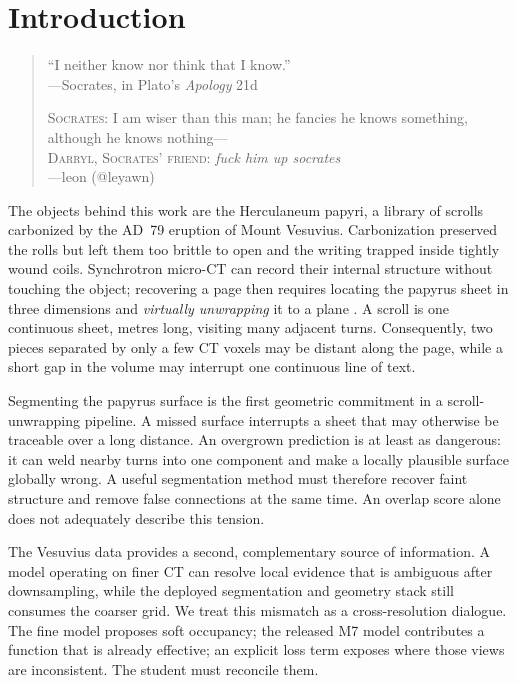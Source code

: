 \section{Introduction}
\label{sec:introduction}

\begin{quote}
\centering\small
``I neither know nor think that I know.''\\[-0.2em]
---Socrates, in Plato's \emph{Apology} 21d~\cite{platoApology21d}

\textsc{Socrates:} I am wiser than this man; he fancies he knows something,
although he knows nothing---\\
\textsc{Darryl, Socrates' friend:} \emph{fuck him up socrates}\\[-0.2em]
---leon (@leyawn)~\cite{leyawn2015socrates}
\end{quote}

The objects behind this work are the Herculaneum papyri, a library of scrolls
carbonized by the AD~79 eruption of Mount Vesuvius.
Carbonization preserved the rolls but left them too brittle to open and the
writing trapped inside tightly wound coils.
Synchrotron micro-CT can record their internal structure without touching the
object; recovering a page then requires locating the papyrus sheet in three
dimensions and \emph{virtually unwrapping} it to a plane
\cite{seales2016damage,vesuviusChallenge}.
A scroll is one continuous sheet, metres long, visiting many adjacent turns.
Consequently, two pieces separated by only a few CT voxels may be distant along
the page, while a short gap in the volume may interrupt one continuous line of
text.

Segmenting the papyrus surface is the first geometric commitment in a
scroll-unwrapping pipeline.
A missed surface interrupts a sheet that may otherwise be traceable over a long
distance.
An overgrown prediction is at least as dangerous: it can weld nearby turns into
one component and make a locally plausible surface globally wrong.
A useful segmentation method must therefore recover faint structure and remove
false connections at the same time.
An overlap score alone does not adequately describe this tension.

The Vesuvius data provides a second, complementary source of information.
A model operating on finer CT can resolve local evidence that is ambiguous after
downsampling, while the deployed segmentation and geometry stack still consumes
the coarser grid.
We treat this mismatch as a cross-resolution dialogue.
The fine model proposes soft occupancy; the released M7 model contributes a
function that is already effective; an explicit loss term exposes where those
views are inconsistent.
The student must reconcile them.

